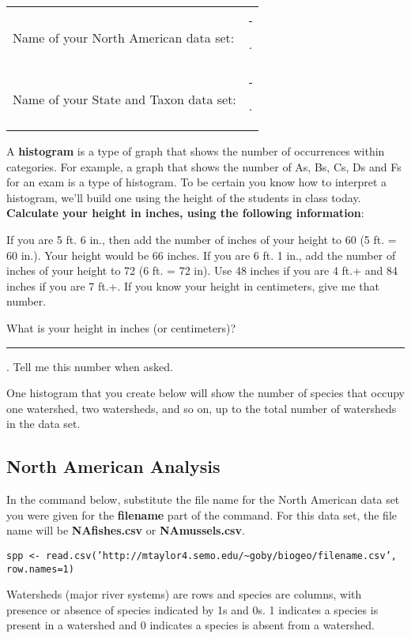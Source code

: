 \documentclass[11pt]{article}
\begin{document}
\begin{tabular}{@{}ll@{}}
Name of your North American data set: & \rule{2in}{0.4pt}.\\[3ex]

Name of your State and Taxon data set: & \rule{2in}{0.4pt}.\\
\end{tabular}

A \textbf{histogram} is a type of graph that shows the number of
occurrences within categories. For example, a graph that shows the
number of As, Bs, Cs, Ds and Fs for an exam is a type of histogram. To
be certain you know how to interpret a histogram, we'll build one using
the height of the students in class today. \textbf{Calculate your height
in inches, using the following information}:

If you are 5 ft. 6 in., then add the number of inches of your height to
60 (5 ft. = 60 in.). Your height would be 66 inches. If you are 6 ft. 1
in., add the number of inches of your height to 72 (6 ft. = 72 in). Use
48 inches if you are 4 ft.+ and 84 inches if you are 7 ft.+. If you know your height in centimeters, give me that number. 

\vspace{2ex}

What is your height in inches (or centimeters)? \rule{1in}{0.4pt}.
Tell me this number when asked.

One histogram that you create below will show the number of species that
occupy one watershed, two watersheds, and so on, up to the total number
of watersheds in the data set.

\subsection*{North American Analysis}

In the command below, substitute the file name for the North American
data set you were given for the \textbf{filename} part of the command.
For this data set, the file name will be \textbf{NAfishes.csv} or
\textbf{NAmussels.csv}. 

\texttt{spp \textless{}-
read.csv('http://mtaylor4.semo.edu/\textasciitilde{}goby/biogeo/filename.csv', row.names=1)}

Watersheds (major river systems) are rows and species are columns, with presence or absence of
species indicated by 1s and 0s. 1 indicates a species is present in a
watershed and 0 indicates a species is absent from a watershed.
\end{document}

